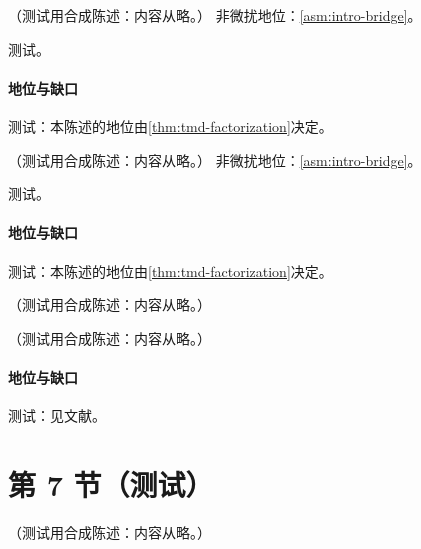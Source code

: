 \begin{corollary}\label{cor:tmd-sivers-observable}
（测试用合成陈述：内容从略。）
非微扰地位：\cref{asm:intro-bridge}。
\end{corollary}
\begin{proofsketch}测试。\end{proofsketch}
\paragraph{地位与缺口}测试：本陈述的地位由\cref{thm:tmd-factorization}决定。

\begin{proposition}\label{prop:tmd-collins-universality}
（测试用合成陈述：内容从略。）
非微扰地位：\cref{asm:intro-bridge}。
\end{proposition}
\begin{proofsketch}测试。\end{proofsketch}
\paragraph{地位与缺口}测试：本陈述的地位由\cref{thm:tmd-factorization}决定。

\begin{definition}\label{def:tmd-etqs}
（测试用合成陈述：内容从略。）
\end{definition}

\begin{proposition}\label{prop:tmd-twist3-matching}
（测试用合成陈述：内容从略。）
\end{proposition}
\paragraph{地位与缺口}测试：见文献。

\section{第 7 节（测试）}\label{sec:tmd-small-b}

\begin{remark}[$\int d^2k_T\,f\ne f$]\label{rem:tmd-kt-integral}
（测试用合成陈述：内容从略。）
\end{remark}

